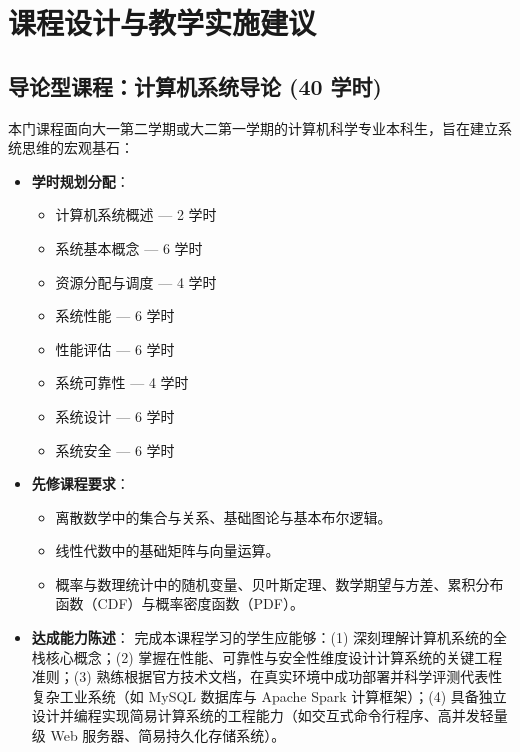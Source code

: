 \section{课程设计与教学实施建议}

\subsection{导论型课程：计算机系统导论 (40 学时)}
本门课程面向大一第二学期或大二第一学期的计算机科学专业本科生，旨在建立系统思维的宏观基石：
\begin{itemize}
    \item \textbf{学时规划分配}：
    \begin{itemize}
        \item 计算机系统概述 --- 2 学时
        \item 系统基本概念 --- 6 学时
        \item 资源分配与调度 --- 4 学时
        \item 系统性能 --- 6 学时
        \item 性能评估 --- 6 学时
        \item 系统可靠性 --- 4 学时
        \item 系统设计 --- 6 学时
        \item 系统安全 --- 6 学时
    \end{itemize}
    \item \textbf{先修课程要求}：
    \begin{itemize}
        \item 离散数学中的集合与关系、基础图论与基本布尔逻辑。
        \item 线性代数中的基础矩阵与向量运算。
        \item 概率与数理统计中的随机变量、贝叶斯定理、数学期望与方差、累积分布函数（CDF）与概率密度函数（PDF）。
    \end{itemize}
    \item \textbf{达成能力陈述}：
    完成本课程学习的学生应能够：(1) 深刻理解计算机系统的全栈核心概念；(2) 掌握在性能、可靠性与安全性维度设计计算系统的关键工程准则；(3) 熟练根据官方技术文档，在真实环境中成功部署并科学评测代表性复杂工业系统（如 MySQL 数据库与 Apache Spark 计算框架）；(4) 具备独立设计并编程实现简易计算系统的工程能力（如交互式命令行程序、高并发轻量级 Web 服务器、简易持久化存储系统）。
\end{itemize}

